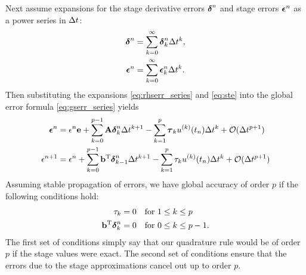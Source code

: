 Next assume expansions for the stage derivative errors $\boldsymbol{\delta}^n$ and
stage errors $\boldsymbol{\epsilon}^n$ as a power series in $\Delta t$:
\begin{subequations} \label{eq:err_series}
\begin{align} \label{eq:rhserr_series}
\boldsymbol{\delta}^n & = \sum_{k=0}^{\infty} \boldsymbol{\delta}_k^n \Delta t^{k}, \\
\boldsymbol{\epsilon}^n & = \sum_{k=0}^{\infty} \boldsymbol{\epsilon}_k^n \Delta t^{k}.
\label{eq:gserr_power_series}
\end{align}
\end{subequations}
Then substituting the expansions \eqref{eq:rhserr_series} and \eqref{eq:ste}
into the global error formula \eqref{eq:gserr_series} yields
\begin{subequations} \label{eq:gserr_rec_both}
\begin{align} \label{eq:gserr_rec}
\boldsymbol{\epsilon}^n & = \epsilon^n \mathbf{e} + \sum_{k=0}^{p-1} \mathbf{A} \boldsymbol{\delta}^n_k \Delta t^{k+1} -\sum_{k=1}^{p} \boldsymbol{\tau}_k u^{(k)}(t_{n}) \Delta t^k + {\cal O}(\Delta t^{p+1}) \\
\epsilon^{n+1} & = \epsilon^n + \sum_{k=0}^{p-1} \mathbf{b}^\mathrm{T}\boldsymbol{\delta}^n_{k-1} \Delta t^{k+1} -\sum_{k=1}^{p} \tau_k u^{(k)}(t_{n}) \Delta t^k + {\cal O}(\Delta t^{p+1}) 
\end{align}
\end{subequations}
Assuming stable propagation of errors, we have global accuracy of order $p$
if the following conditions hold:
\begin{align*}    
\tau_k & = 0  & \mbox{for }  & 1\le k\le p \\
\mathbf{b}^\mathrm{T}\boldsymbol{\delta}^n_k & = 0 &  \mbox{for } & 0\le k\le p-1.
\end{align*}
The first set of conditions simply say that our quadrature rule would be of order $p$
if the stage values were exact.
The second set of conditions ensure that the errors due to the stage approximations
cancel out up to order $p$.

